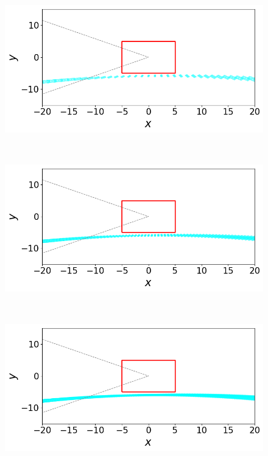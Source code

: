 \begin{figure}
\begin{minipage}{0.48\textwidth}
\begin{minipage}[b]{\linewidth}
  \centering
  \includegraphics[width=0.9\columnwidth,trim=0 1.3em 0 0, clip]{images/step_a_1_0.png}
\end{minipage}%
\\
\vspace{0.5em}
\begin{minipage}[b]{\linewidth}
  \centering
    \includegraphics[width=0.9\columnwidth,trim=0 1.3em 0 0, clip]{images/step_b_0_5.png}
\end{minipage}
\\
\vspace{0.5em}
\begin{minipage}[b]{\linewidth}
  \centering
    \includegraphics[width=0.9\columnwidth,trim=0 1.3em 0 0, clip]{images/step_c_0_25.png}

\end{minipage}
\end{minipage}
\end{figure}
